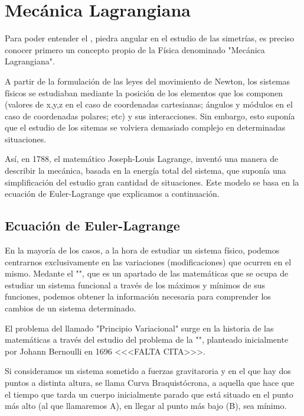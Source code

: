 \section{Mecánica Lagrangiana}
Para poder entender el  , piedra angular en el estudio de las simetrías, es preciso conocer primero un concepto propio de la Física denominado "Mecánica Lagrangiana".

A partir de la formulación de las leyes del movimiento de Newton, los sistemas físicos se estudiaban mediante la posición de los elementos que los componen (valores de x,y,z en el caso de coordenadas cartesianas; ángulos y módulos en el caso de coordenadas polares; etc) y sus interacciones. Sin embargo, esto suponía que el estudio de los sitemas se volviera demasiado complejo en determinadas situaciones.

Así, en 1788, el matemático Joseph-Louis Lagrange, inventó una manera de describir la mecánica, basada en la energía total del sistema, que suponía una simplificación del estudio gran cantidad de situaciones. Este modelo se basa en la ecuación de Euler-Lagrange que explicamos a continuación.

\subsection{Ecuación de Euler-Lagrange}\label{sec:ecuacion-de-euler-lagrange}

En la mayoría de los casos, a la hora de estudiar un sistema físico, podemos centrarnos exclusivamente en las variaciones (modificaciones) que ocurren en el mismo. Medante el "", que es un apartado de las matemáticas que se ocupa de estudiar un sistema funcional a través de los máximos y mínimos de sus funciones, podemos obtener la información necesaria para comprender los cambios de un sistema determinado.

El problema del llamado "Principio Variacional" surge en la historia de las matemáticas a través del estudio del problema de la "", planteado inicialmente por Johann Bernoulli en 1696 <<<FALTA CITA>>>.

Si consideramos un sistema sometido a fuerzas gravitaroria y en el que hay dos puntos a distinta altura, se llama Curva Braquistócrona, a aquella que hace que el tiempo que tarda un cuerpo inicialmente parado que está situado en el punto más alto (al que llamaremos A), en llegar al punto más bajo (B), sea mínimo.

